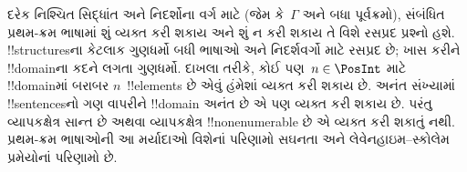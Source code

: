 \documentclass[../../../include/open-logic-section]{subfiles}
\begin{document}
દરેક નિશ્ચિત સિદ્ધાંત અને નિદર્શોના વર્ગ માટે (જેમ કે~$\Gamma$ અને
બધા પૂર્વક્રમો), સંબંધિત પ્રથમ-ક્રમ ભાષામાં શું વ્યક્ત કરી શકાય અને
શું ન કરી શકાય તે વિશે રસપ્રદ પ્રશ્નો હશે. !!{structure}sના કેટલાક
ગુણધર્મો બધી ભાષાઓ અને નિદર્શવર્ગો માટે રસપ્રદ છે; ખાસ કરીને
!!{domain}ના કદને લગતા ગુણધર્મો. દાખલા તરીકે, કોઈ પણ~$n \in \PosInt$
માટે !!{domain}માં બરાબર $n$~!!{element}s છે એવું હંમેશાં વ્યક્ત કરી
શકાય છે. અનંત સંખ્યામાં !!{sentence}sનો ગણ વાપરીને !!{domain} અનંત
છે એ પણ વ્યક્ત કરી શકાય છે. પરંતુ વ્યાપકક્ષેત્ર સાન્ત છે અથવા
વ્યાપકક્ષેત્ર !!{nonenumerable} છે એ વ્યક્ત કરી શકાતું નથી.
પ્રથમ-ક્રમ ભાષાઓની આ મર્યાદાઓ વિશેનાં પરિણામો સઘનતા અને
લેવેનહાઇમ--સ્કોલેમ પ્રમેયોનાં પરિણામો છે.
\end{document}

